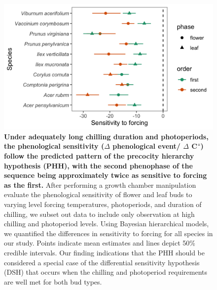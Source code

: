 \documentclass[11pt]{article}
\begin{document}
\begin{figure}[h!]
    \centering
         \includegraphics[width=.8\textwidth]{..//Plots/Flobuds_manuscript_figs/phh_plot.png}
    \caption{\textbf{Under adequately long chilling duration and photoperiods, the phenological sensitivity ($\Delta$ phenological event/ $\Delta$ C$\degree$) follow the predicted pattern of the precocity hierarchy hypothesis (PHH), with the second phenophase of the sequence being approximately twice as sensitive to forcing as the first.} After performing a growth chamber manipulation evaluate the phenological sensitivity of flower and leaf buds to varying level forcing temperatures, photoperiods, and duration of chilling, we subset out data to include only observation at high chilling and photoperiod levels. Using Bayesian hierarchical models, we quantified the differences in sensitivity to forcing for all species in our study. Points indicate mean estimates and lines depict 50\% credible intervals. Our finding indications that the PHH should be considered a special case of the differential sensitivity hypothesis (DSH) that occurs when the chilling and photoperiod requirements are well met for both bud types.}
    \label{fig:phh}
\end{figure}
\end{document}

